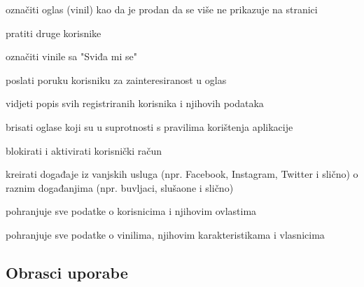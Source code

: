 \begin{packed_enum}
\begin{packed_enum}
\begin{packed_enum}
					\end{packed_enum}
					
					\item označiti oglas (vinil) kao da je prodan da se više ne prikazuje na stranici
					\item pratiti druge korisnike
					\item označiti vinile sa "Sviđa mi se"
					\item poslati poruku korisniku za zainteresiranost u oglas
							
				\end{packed_enum}
				
				\item  {}
				
					\begin{packed_enum}
					
						\item vidjeti popis svih registriranih korisnika i njihovih podataka
						\item brisati oglase koji su u suprotnosti s pravilima korištenja aplikacije
						\item blokirati i aktivirati korisnički račun
						\item kreirati događaje iz vanjskih usluga (npr. Facebook, Instagram, Twitter i slično) o raznim događanjima (npr. buvljaci, slušaone i slično)
						
					\end{packed_enum}
					
				\item  {}
				
					\begin{packed_enum}
					
						\item pohranjuje sve podatke o korisnicima i njihovim ovlastima
						\item pohranjuje sve podatke o vinilima, njihovim karakteristikama i vlasnicima
						
					\end{packed_enum}	
									
				
			\end{packed_enum}
			
			\eject 
			
			
				
			\subsection{Obrasci uporabe}
				

